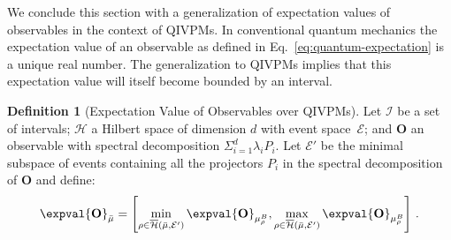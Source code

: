 \documentclass[english,reprint, aps, prl,superscriptaddress, showpacs,
showkeys, longbibliography, amsmath, amssymb, floatfix]{revtex4-1}
\theoremstyle{plain}
\theoremstyle{definition}
\newtheorem{definition}{Definition}
\newcommand{\Hilb}{\mathcal{H}}
\newcommand{\events}{\ensuremath{\mathcal{E}}}
\newcommand{\coreBorn}{\ensuremath{\overline{\Hilb}}}
\newcommand{\muB}{\ensuremath{\mu^{B}}}
\begin{document}
We conclude this section with a generalization of expectation values
of observables in the context of QIVPMs. In conventional quantum
mechanics the expectation value of an observable as defined in
Eq.~\eqref{eq:quantum-expectation} is a unique real number. The
generalization to QIVPMs implies that this expectation value will
itself become bounded by an interval. 

\begin{definition}[Expectation Value of Observables over QIVPMs] Let
  $\mathscr{I}$ be a set of intervals; $\Hilb$ a Hilbert space of
  dimension $d$ with event space~$\events$; and $\mathbf{O}$ an
  observable with spectral decomposition
  $\Sigma_{i=1}^d \lambda_iP_i$. Let $\events'$ be the minimal
  subspace of events containing all the projectors $P_i$ in the
  spectral decomposition of $\mathbf{O}$ and define:
\begin{equation}
\expval{\mathbf{O}}_{\bar{\mu}}=\left[\min_{\rho\in\coreBorn\left(\bar{\mu},\events'\right)}
\expval{\mathbf{O}}_{\muB_{\rho}},\max_{\rho\in\coreBorn\left(\bar{\mu},\events'\right)}
\expval{\mathbf{O}}_{\muB_{\rho}}\right]\,. \label{eq:quantum-interval-expectation-core}
\end{equation}
\end{definition}
\end{document}
